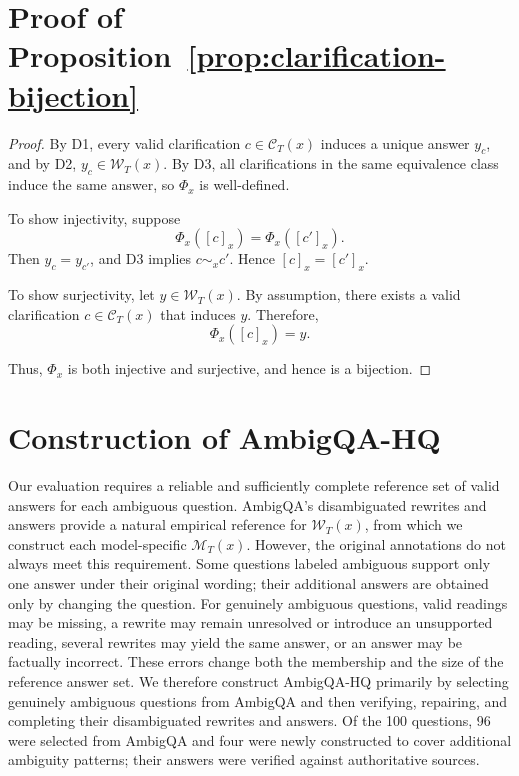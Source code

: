 



\clearpage
\appendix

\section{Proof of Proposition~\ref{prop:clarification-bijection}}
\label{app:proof-bijection}

\clarificationbijection*

\begin{proof}
By D1, every valid clarification $c \in \mathcal{C}_T(x)$ induces a unique answer $y_c$, and by D2,
$y_c \in \mathcal{W}_T(x)$. By D3, all clarifications in the same equivalence class induce the same answer, so $\Phi_x$ is well-defined.

To show injectivity, suppose
\[
    \Phi_x([c]_x) = \Phi_x([c']_x).
\]
Then $y_c = y_{c'}$, and D3 implies $c \sim_x c'$.
Hence $[c]_x = [c']_x$.

To show surjectivity, let $y \in \mathcal{W}_T(x)$.
By assumption, there exists a valid clarification $c \in \mathcal{C}_T(x)$ that induces $y$.
Therefore,
\[
    \Phi_x([c]_x) = y .
\]

Thus, $\Phi_x$ is both injective and surjective, and hence is a bijection.
\end{proof}


\section{Construction of AmbigQA-HQ}
\label{app:ambigqa-hq}

Our evaluation requires a reliable and sufficiently complete reference set of valid answers for each ambiguous question. AmbigQA's disambiguated rewrites and answers \citep{min-etal-2020-ambigqa} provide a natural empirical reference for \(\mathcal{W}_T(x)\), from which we construct each model-specific \(\mathcal{M}_T(x)\). However, the original annotations do not always meet this requirement. Some questions labeled ambiguous support only one answer under their original wording; their additional answers are obtained only by changing the question. For genuinely ambiguous questions, valid readings may be missing, a rewrite may remain unresolved or introduce an unsupported reading, several rewrites may yield the same answer, or an answer may be factually incorrect. These errors change both the membership and the size of the reference answer set. We therefore construct AmbigQA-HQ primarily by selecting genuinely ambiguous questions from AmbigQA and then verifying, repairing, and completing their disambiguated rewrites and answers. Of the 100 questions, 96 were selected from AmbigQA and four were newly constructed to cover additional ambiguity patterns; their answers were verified against authoritative sources.


